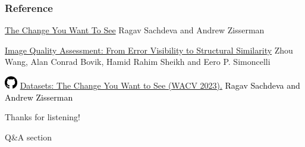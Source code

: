 \documentclass[13.5pt,aspecratio=169, xcolor=dvipsnames]{beamer}
\begin{document}
\onehalfspacing
\begin{frame} %
	\frametitle{Reference}
	
	\begin{thebibliography}{99} %
		\footnotesize %
		
			\href{https://arxiv.org/pdf/2209.14341.pdf}{The Change You Want To See}
			\newblock Ragav Sachdeva and Andrew Zisserman

        \href{https://www.cns.nyu.edu/pub/eero/wang03-reprint.pdf}{Image Quality Assessment: From Error Visibility to
        Structural Similarity}
			\newblock Zhou Wang, Alan Conrad Bovik, Hamid Rahim Sheikh and Eero P. Simoncelli
		
        \hspace{-1.9em}\includegraphics[width=1.5em]{Icons/github.png}
        \textcolor{blue}{\href{https://github.com/ragavsachdeva/The-Change-You-Want-to-See/tree/main?fbclid=IwAR0LKUHmVIEYSDTCgl2KeV5jir1pUlMSYJTbHbirilqWH_eZ4N9FxHwTQto\#datasets}{Datasets: The Change You Want to See (WACV 2023).}}
          \newblock \textcolor{black}{Ragav Sachdeva and Andrew Zisserman}
	\end{thebibliography}
\end{frame}




\begin{frame} %
	\begin{center}
		{\Huge Thanks for listening!}
		
		\bigskip\bigskip %
		
		{\LARGE Q\&A section}
	\end{center}
\end{frame}
\end{document}
